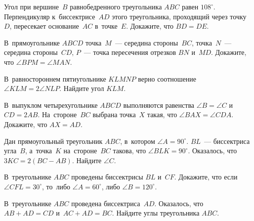 


\begin{problems}

\item
Угол при вершине~$B$ равнобедренного треугольника $ABC$ равен $108^{\circ}$.
Перпендикуляр к~биссектрисе~$AD$ этого треугольника, проходящий через
точку~$D$, пересекает основание~$AC$ в~точке~$E$.
Докажите, что $BD = DE$.

\item
В~прямоугольнике $ABCD$ точка~$M$~--- середина стороны~$BC$, точка~$N$~---
середина стороны~$CD$, $P$~--- точка пересечения отрезков $BN$ и~$MD$.
Докажите, что $\angle BPM = \angle MAN$.

\item
В~равностороннем пятиугольнике $KLMNP$ верно соотношение
$\angle KLM = 2 \angle NLP$.
Найдите угол $KLM$.

\item
В~выпуклом четырехугольнике $ABCD$ выполняются равенства $\angle B = \angle C$
и~$CD = 2 AB$.
На~стороне~$BC$ выбрана точка~$X$ такая, что $\angle BAX = \angle CDA$.
Докажите, что $AX = AD$.

\item
Дан прямоугольный треугольник $ABC$, в~котором $\angle A = 90^{\circ}$.
$BL$~--- биссектриса угла~$B$, а~точка~$K$ на~стороне~$BC$ такова, что
$\angle BLK = 90^{\circ}$.
Оказалось, что $3 KC = 2 (BC - AB)$.
Найдите $\angle C$.

\item
В~треугольнике $ABC$ проведены биссектрисы $BL$ и~$CF$.
Докажите, что если $\angle CFL = 30^{\circ}$, то~либо $\angle A = 60^{\circ}$,
либо $\angle B = 120^{\circ}$.

\item
В~треугольнике $ABC$ проведена биссектриса~$AD$.
Оказалось, что $AB + AD = CD$ и~$AC + AD = BC$.
Найдите углы треугольника $ABC$.

\end{problems}

